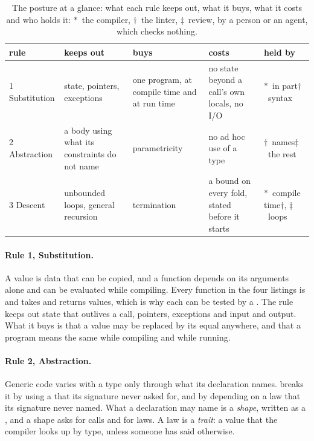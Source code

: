 \begin{table}[tb]
\centering
\small
\begin{tabularx}{\linewidth}{@{}l>{\raggedright\arraybackslash}X>{\raggedright\arraybackslash}X>{\raggedright\arraybackslash}X>{\raggedright\arraybackslash}X@{}}
\toprule
rule & keeps out & buys & costs & held by \\
\midrule
1 Substitution & state, pointers, exceptions & one program, at compile time and at run time & no state beyond a call's own locals, no I/O & $\ast$~in part\newline $\dagger$~syntax \\
2 Abstraction & a body using what its constraints do not name & parametricity & no ad hoc use of a type & $\dagger$~names\newline $\ddagger$~the rest \\
3 Descent & unbounded loops, general recursion & termination & a bound on every fold, stated before it starts & $\ast$~compile time\newline $\dagger$, $\ddagger$~loops \\
\bottomrule
\end{tabularx}
\caption{The posture at a glance: what each rule keeps out, what it buys, what it costs and who holds it: $\ast$~the compiler, $\dagger$~the linter, $\ddagger$~review, by a person or an agent, which checks nothing.}
\label{tab:posture}
\end{table}

\paragraph{Rule 1, Substitution.}
\label{def:rule1}
A value is data that can be copied, and a function depends on its arguments alone and can be evaluated while compiling.
Every function in the four listings is  and takes and returns values, which is why each can be tested by a .
The rule keeps out state that outlives a call, pointers, exceptions and input and output.
What it buys is that a value may be replaced by its equal anywhere, and that a program means the same while compiling and while running.

\paragraph{Rule 2, Abstraction.}
\label{def:rule2}
Generic code varies with a type only through what its declaration names.
 breaks it by using a \cppinline{+} that its signature never asked for, and  by depending on a law that its signature never named.
What a declaration may name is a \emph{shape}, written as a , and a shape asks for calls and for laws.
A law is a \emph{trait}: a value that the compiler looks up by type,  unless someone has said otherwise.

